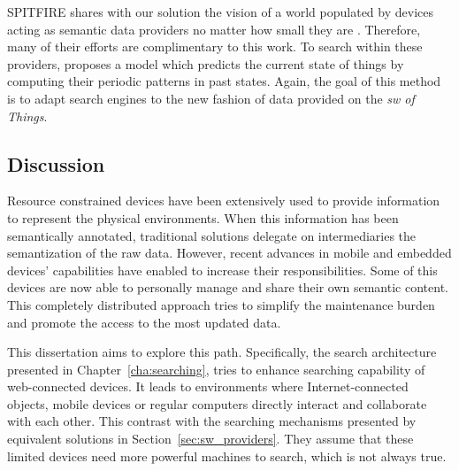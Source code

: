 SPITFIRE shares with our solution the vision of a world populated by devices acting as semantic data providers no matter how small they are \citep{hasemann_rdf_2012}.
Therefore, many of their efforts are complimentary to this work.
To search within these providers, \citet{pfisterer_spitfire:_2011} proposes a model which predicts the current state of things by computing their periodic patterns in past states.
Again, the goal of this method is to adapt search engines to the new fashion of data provided on the \emph{\acl{sw} of Things}.


\subsection{Discussion}

Resource constrained devices have been extensively used to provide information to represent the physical environments.
When this information has been semantically annotated, traditional solutions delegate on intermediaries the semantization of the raw data.
However, recent advances in mobile and embedded devices' capabilities have enabled to increase their responsibilities.
Some of this devices are now able to personally manage and share their own semantic content.
This completely distributed approach tries to simplify the maintenance burden and promote the access to the most updated data.


This dissertation aims to explore this path.
Specifically, the search architecture presented in Chapter~\ref{cha:searching}, tries to enhance searching capability of web-connected devices.
It leads to environments where Internet-connected objects, mobile devices or regular computers directly interact and collaborate with each other. %
This contrast with the searching mechanisms presented by equivalent solutions in Section~\ref{sec:sw_providers}.
They assume that these limited devices need more powerful machines to search, which is not always true. %